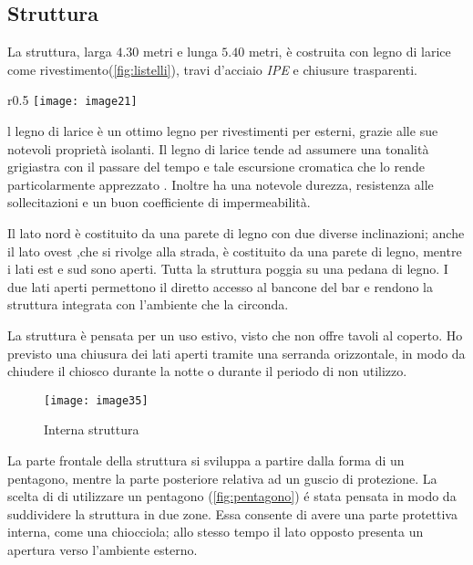 \clearpage
\subsection{Struttura}


La struttura, larga $4.30$ metri e lunga $5.40$ metri, è costruita con legno di larice come rivestimento(\cref{fig:listelli}), travi  d'acciaio \textit{IPE}  e chiusure trasparenti.

\begin{wrapfigure}[11]{r}{0.5\textwidth}
	\centering
	\texttt{[image: image21]}
	\caption{Listelli in legno}
	\label{fig:listelli}
\end{wrapfigure}

l legno di larice è un ottimo legno per rivestimenti per esterni, grazie alle sue notevoli proprietà isolanti. Il legno di larice tende ad assumere una tonalità grigiastra con il passare del tempo e tale escursione cromatica che lo rende particolarmente apprezzato . Inoltre ha una notevole durezza, resistenza alle sollecitazioni e un buon coefficiente di impermeabilità. 

Il lato nord è costituito da una parete di legno con due diverse inclinazioni; anche il lato ovest ,che si rivolge alla strada, è costituito da una parete di legno, mentre i lati est e sud sono aperti. Tutta la struttura poggia su una pedana di legno. I due lati aperti permettono il diretto accesso al bancone del bar e rendono la struttura integrata con l’ambiente che la circonda. 

La struttura è pensata per un uso estivo, visto che non offre tavoli al coperto. 
Ho previsto una chiusura dei lati aperti tramite una serranda orizzontale, 
in modo da chiudere il chiosco durante la notte o durante il periodo di non utilizzo. 

\begin{figure}[H]
	\centering
	\texttt{[image: image35]}
	\caption{Interna struttura}
	\label{fig:pedana}
\end{figure}

\clearpage
La parte frontale della struttura si sviluppa a partire dalla forma di un pentagono, mentre la parte posteriore relativa ad un guscio di protezione. La scelta di di utilizzare un pentagono (\cref{fig:pentagono}) é stata pensata in modo da suddividere la struttura in due zone. Essa consente di avere una parte protettiva interna, come una chiocciola; allo stesso tempo il lato opposto presenta un apertura verso l'ambiente esterno.

